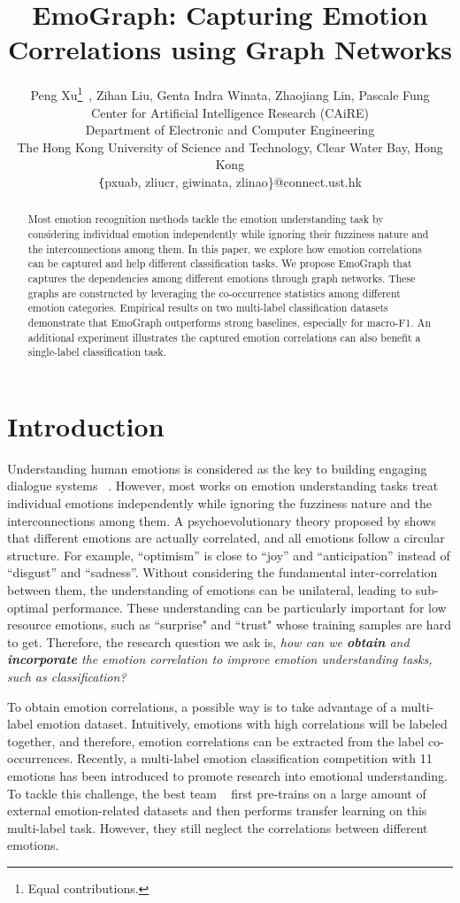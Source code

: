 \documentclass[11pt,a4paper]{article}
\title{EmoGraph: Capturing Emotion Correlations using Graph Networks}
\author{Peng Xu\thanks{ Equal contributions.}~, Zihan Liu, Genta Indra Winata, Zhaojiang Lin, Pascale Fung \\
Center for Artificial Intelligence Research (CAiRE)\\
Department of Electronic and Computer Engineering\\
The Hong Kong University of Science and Technology, Clear Water Bay, Hong Kong\\
\texttt\{pxuab, zliucr, giwinata, zlinao\}@connect.ust.hk}
\date{}
\begin{document}
\maketitle
\begin{abstract}
Most emotion recognition methods tackle the emotion understanding task by considering individual emotion independently while ignoring their fuzziness nature and the interconnections among them. In this paper, we explore how emotion correlations can be captured and help different classification tasks. We propose EmoGraph that captures the dependencies among different emotions through graph networks. These graphs are constructed by leveraging the co-occurrence statistics among different emotion categories. Empirical results on two multi-label classification datasets demonstrate that EmoGraph outperforms strong baselines, especially for macro-F1. An additional experiment illustrates the captured emotion correlations can also benefit a single-label classification task.
\end{abstract}

\section{Introduction}



Understanding human emotions is considered as the key to building engaging dialogue systems ~\cite{zhou2018design}. However, most works on emotion understanding tasks treat individual emotions independently while ignoring the fuzziness nature and the interconnections among them. A psychoevolutionary theory proposed by \citet{plutchik1984emotions} shows that different emotions are actually correlated, and all emotions follow a circular structure. For example, ``optimism'' is close to ``joy'' and ``anticipation'' instead of ``disgust'' and ``sadness''. Without considering the fundamental inter-correlation between them, the understanding of emotions can be unilateral, leading to sub-optimal performance. These understanding can be particularly important for low resource emotions, such as ``surprise" and ``trust" whose training samples are hard to get. 
Therefore, the research question we ask is, \textit{how can we \textbf{obtain} and \textbf{incorporate} the emotion correlation to improve emotion understanding tasks, such as classification?}

To obtain emotion correlations, a possible way is to take advantage of a multi-label emotion dataset. Intuitively, emotions with high correlations will be labeled together, and therefore, emotion correlations can be extracted from the label co-occurrences. Recently, a multi-label emotion classification competition \cite{mohammad2018semeval} with 11 emotions has been introduced to promote research into emotional understanding. To tackle this challenge, the best team ~\cite{baziotis2018ntua} first pre-trains on a large amount of external emotion-related datasets and then performs transfer learning on this multi-label task. However, they still neglect the correlations between different emotions.
\end{document}

